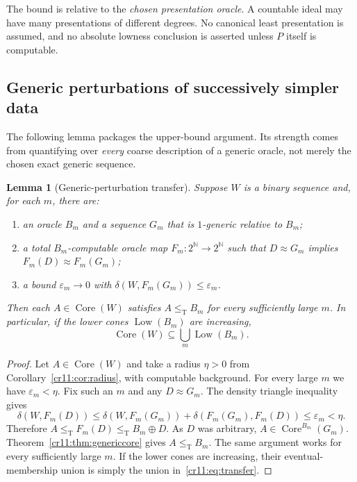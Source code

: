 \documentclass[11pt,letterpaper]{article}
\theoremstyle{plain}
\newtheorem{lemma}[theorem]{Lemma}
\theoremstyle{definition}
\theoremstyle{remark}
\numberwithin{equation}{section}
\newcommand{\N}{\mathbb N}
\newcommand{\Cantor}{2^{\N}}
\newcommand{\leT}{\leq_{\mathrm T}}
\newcommand{\Core}{\operatorname{Core}}
\newcommand{\Low}{\operatorname{Low}}
\newcommand{\join}{\mathbin{\oplus}}
\newcommand{\eps}{\varepsilon}
\begin{document}
The bound is relative to the \emph{chosen presentation oracle}. A countable
ideal may have many presentations of different degrees. No canonical least
presentation is assumed, and no absolute lowness conclusion is asserted
unless $P$ itself is computable.

\subsection{Generic perturbations of successively simpler data}

The following lemma packages the upper-bound argument. Its strength comes
from quantifying over \emph{every} coarse description of a generic oracle,
not merely the chosen exact generic sequence.

\begin{lemma}[Generic-perturbation transfer]\label{cr11:lem:transfer}
Suppose $W$ is a binary sequence and, for each $m$, there are:
\begin{enumerate}[label=\textup{(\roman*)}]
\item an oracle $B_m$ and a sequence $G_m$ that is $1$-generic relative to
$B_m$;
\item a total $B_m$-computable oracle map $F_m:\Cantor\to\Cantor$ such that
$D\approx G_m$ implies $F_m(D)\approx F_m(G_m)$;
\item a bound $\eps_m\to0$ with
$\delta(W,F_m(G_m))\leq\eps_m$.
\end{enumerate}
Then each $A\in\Core(W)$ satisfies $A\leT B_m$ for every sufficiently
large $m$. In particular, if the lower cones $\Low(B_m)$ are increasing,
\begin{equation}\label{cr11:eq:transfer}
                 \Core(W)\subseteq\bigcup_m\Low(B_m).
\end{equation}
\end{lemma}
\begin{proof}
Let $A\in\Core(W)$ and take a radius $\eta>0$ from
Corollary~\ref{cr11:cor:radius}, with computable background. For every large $m$
we have $\eps_m<\eta$. Fix such an $m$ and any $D\approx G_m$.
The density triangle inequality gives
\[
 \delta(W,F_m(D))
 \leq\delta(W,F_m(G_m))+\delta(F_m(G_m),F_m(D))
 \leq\eps_m<\eta.
\]
Therefore $A\leT F_m(D)\leT B_m\join D$. As $D$ was arbitrary,
$A\in\Core^{B_m}(G_m)$. Theorem~\ref{cr11:thm:genericcore} gives $A\leT B_m$.
The same argument works for every sufficiently large $m$. If the lower
cones are increasing, their eventual-membership union is simply the union
in~\eqref{cr11:eq:transfer}.
\end{proof}
\end{document}
